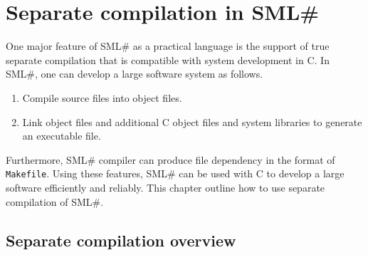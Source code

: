 \documentclass{jbook}
\newif\ifjp
\newcommand{\txt}[2]{#2}
\newcommand{\smlsharp}{SML\#}
\begin{document}
\chapter{
\txt{\smlsharp{}分割コンパイルシステム}
 {Separate compilation in \smlsharp{}}
}
\label{chap:tutorialSeparatecompilation}

\ifjp%
	実用言語としての\smlsharp{}の大きな特徴は，完全な分割コンパイル
のサポートです．
	以下の手順で大規模なプログラムを開発していくことができます．
\begin{enumerate}
\item 個々のプログラムモジュールのオブジェクトファイルへのコンパイル
\item オブジェクトファイルを，C言語のオブジェクトファイルやシステムライ
ブラリとともにリンクし実行形式ファイルを作成する．
\end{enumerate}
	さらに\smlsharp{}コンパイラは，各オブジェクトの依存関係をシステ
ムの{\tt make}コマンドが解釈できる形式で出力することができます．
	この機能を使用すれば，C言語などとともに大規模システムを効率よく
開発することが可能です．
	本章では，この分割コンパイルシステムの概要を説明します．
\else%
	One major feature of \smlsharp{} as a practical language is the
support of  true separate compilation that is compatible with system
development in C.
	In \smlsharp{}, one can develop a large software system as follows.
\begin{enumerate}
\item Compile source files into object files.
\item Link object files and additional C object files and system
libraries to generate an executable file.
\end{enumerate}
	Furthermore, \smlsharp{} compiler can produce file dependency in
the format of {\tt Makefile}.
	Using these features, \smlsharp{} can be used with C to develop
a large software efficiently and reliably.
	This chapter outline how to use separate compilation of \smlsharp.
\fi%

\section{\txt{分割コンパイルの概要}{Separate compilation overview}}
\label{sec:tutorialSeparateCompilation}
\end{document}
